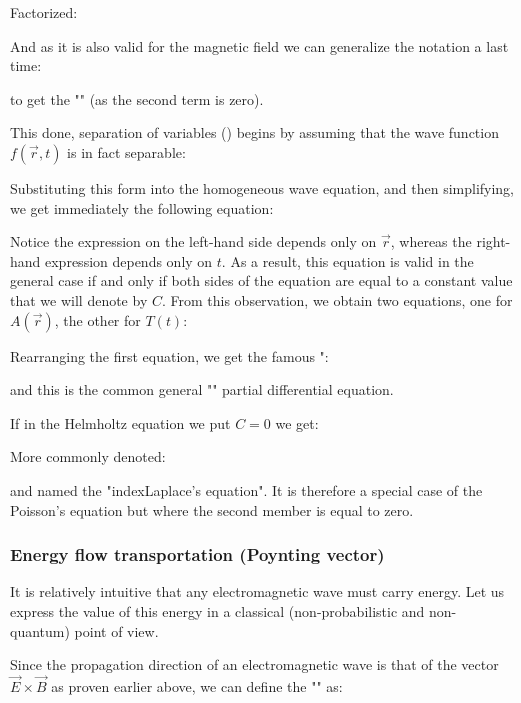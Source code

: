 	Factorized:
	
	And as it is also valid for the magnetic field we can generalize the notation a last time:
	
	to get the "" (as the second term is zero).

	This done, separation of variables () begins by assuming that the wave function $f(\vec{r}, t)$ is in fact separable:
	
	Substituting this form into the homogeneous wave equation, and then simplifying, we get immediately the following equation:
	
	Notice the expression on the left-hand side depends only on $\vec{r}$, whereas the right-hand expression depends only on $t$. As a result, this equation is valid in the general case if and only if both sides of the equation are equal to a constant value that we will denote by $C$. From this observation, we obtain two equations, one for $A(\vec{r})$, the other for $T(t)$:
	
	Rearranging the first equation, we get the famous ":
	
	and this is the common general "" partial differential equation.
	\begin{tcolorbox}[title=Remark,colframe=black,arc=10pt]
	If in the Helmholtz equation we put $C=0$ we get:
	
	More commonly denoted:
	
	and named the "index{Laplace's equation}". It is therefore a special case of the Poisson's equation but where the second member is equal to zero.
	\end{tcolorbox}
	
	
	\subsubsection{Energy flow transportation (Poynting vector)}\label{poynting vector}
	It is relatively intuitive that any electromagnetic wave must carry energy. Let us express the value of this energy in a classical (non-probabilistic and non-quantum) point of view.

	Since the propagation direction of an electromagnetic wave is that of the vector $\vec{E}\times\vec{B}$ as proven earlier above, we can define the "" as:
	
